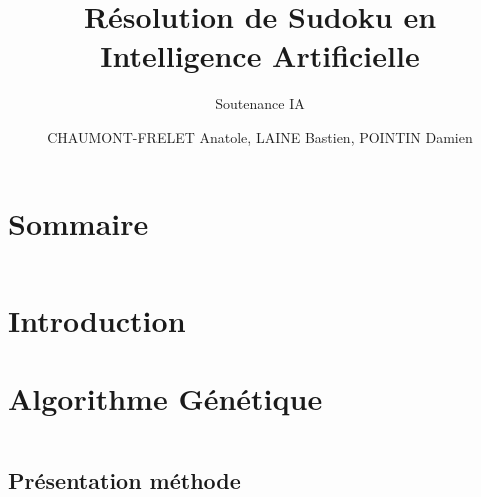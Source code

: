 \documentclass{beamer}
\title{Résolution de Sudoku en Intelligence Artificielle}
\subtitle{Soutenance IA}
\author{CHAUMONT-FRELET Anatole, LAINE Bastien, POINTIN Damien}
\institute{Génie Mathématique | INSA Rouen}
\begin{document}
    \beamertemplatenavigationsymbolsempty

    \begin{frame}
        \titlepage{}
    \end{frame}

    \section*{Sommaire}
        \begin{frame}
            \begin{columns}[t]
  				\begin{column}{5cm}
  					\tableofcontents[sections={1-4}]
  				\end{column}
  				\begin{column}{5cm}
  					\tableofcontents[sections={5-8}]
  				\end{column}
  			\end{columns}
        \end{frame}

    \section{Introduction}
        \subsection{ }
            

    \section{Algorithme Génétique}
        \begin{frame}
            \begin{columns}[t]
  				\begin{column}{5cm}
  					\tableofcontents[sections={1-4}, currentsection]
  				\end{column}
  				\begin{column}{5cm}
  					\tableofcontents[sections={5-8}, currentsection]
  				\end{column}
  			\end{columns}
        \end{frame}
        \subsection{Présentation méthode}
            \begin{frame}
                \begin{columns}[t]
                    \begin{column}{5cm}
                        \tableofcontents[sections={1-4}, currentsubsection, currentsection]
                    \end{column}
                    \begin{column}{5cm}
                        \tableofcontents[sections={5-8}, currentsubsection, currentsection]
                    \end{column}
                \end{columns}
            \end{frame}
	        
\end{document}
